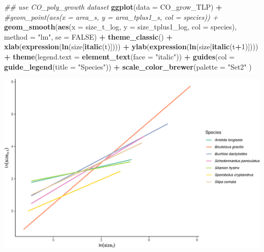 \documentclass[
]{article}
\newenvironment{Shaded}{\begin{snugshade}}{\end{snugshade}}
\newcommand{\CommentTok}[1]{\textcolor[rgb]{0.56,0.35,0.01}{\textit{#1}}}
\newcommand{\DataTypeTok}[1]{\textcolor[rgb]{0.13,0.29,0.53}{#1}}
\newcommand{\DecValTok}[1]{\textcolor[rgb]{0.00,0.00,0.81}{#1}}
\newcommand{\KeywordTok}[1]{\textcolor[rgb]{0.13,0.29,0.53}{\textbf{#1}}}
\newcommand{\NormalTok}[1]{#1}
\newcommand{\OperatorTok}[1]{\textcolor[rgb]{0.81,0.36,0.00}{\textbf{#1}}}
\newcommand{\OtherTok}[1]{\textcolor[rgb]{0.56,0.35,0.01}{#1}}
\newcommand{\StringTok}[1]{\textcolor[rgb]{0.31,0.60,0.02}{#1}}
\begin{document}
\begin{Shaded}
\begin{Highlighting}[]
\CommentTok{\#\# use CO\_poly\_growth dataset}
\KeywordTok{ggplot}\NormalTok{(}\DataTypeTok{data =}\NormalTok{ CO\_grow\_TLP) }\OperatorTok{+}
\StringTok{  }\CommentTok{\#geom\_point(aes(x = area\_s, y = area\_tplus1\_s, col = species)) +}
\StringTok{  }\KeywordTok{geom\_smooth}\NormalTok{(}\KeywordTok{aes}\NormalTok{(}\DataTypeTok{x =}\NormalTok{ size\_t\_log, }\DataTypeTok{y =}\NormalTok{ size\_tplus1\_log, }\DataTypeTok{col =}\NormalTok{ species), }\DataTypeTok{method =} \StringTok{"lm"}\NormalTok{, }\DataTypeTok{se =} \OtherTok{FALSE}\NormalTok{) }\OperatorTok{+}
\StringTok{  }\KeywordTok{theme\_classic}\NormalTok{() }\OperatorTok{+}
\StringTok{  }\KeywordTok{xlab}\NormalTok{(}\KeywordTok{expression}\NormalTok{(}\KeywordTok{ln}\NormalTok{(size[}\KeywordTok{italic}\NormalTok{(t)]))) }\OperatorTok{+}
\StringTok{  }\KeywordTok{ylab}\NormalTok{(}\KeywordTok{expression}\NormalTok{(}\KeywordTok{ln}\NormalTok{(size[}\KeywordTok{italic}\NormalTok{(t}\OperatorTok{+}\DecValTok{1}\NormalTok{)]))) }\OperatorTok{+}
\StringTok{  }\KeywordTok{theme}\NormalTok{(}\DataTypeTok{legend.text =} \KeywordTok{element\_text}\NormalTok{(}\DataTypeTok{face =} \StringTok{"italic"}\NormalTok{)) }\OperatorTok{+}
\StringTok{  }\KeywordTok{guides}\NormalTok{(}\DataTypeTok{col =} \KeywordTok{guide\_legend}\NormalTok{(}\DataTypeTok{title =} \StringTok{"Species"}\NormalTok{)) }\OperatorTok{+}
\StringTok{  }\KeywordTok{scale\_color\_brewer}\NormalTok{(}\DataTypeTok{palette =} \StringTok{"Set2"}\NormalTok{ )}
\end{Highlighting}
\end{Shaded}

\includegraphics{figures/SizeCompFig-1.pdf}
\end{document}
